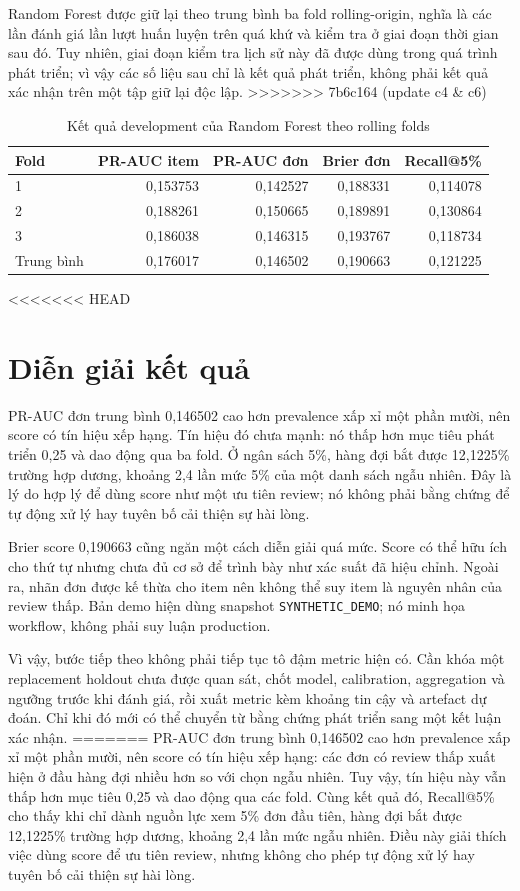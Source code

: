 Random Forest được giữ lại theo trung bình ba fold rolling-origin, nghĩa là các lần đánh giá lần lượt huấn luyện trên quá khứ và kiểm tra ở giai đoạn thời gian sau đó. Tuy nhiên, giai đoạn kiểm tra lịch sử này đã được dùng trong quá trình phát triển; vì vậy các số liệu sau chỉ là kết quả phát triển, không phải kết quả xác nhận trên một tập giữ lại độc lập.
>>>>>>> 7b6c164 (update c4 & c6)

\begin{table}[htbp]
\centering\small
\caption{Kết quả development của Random Forest theo rolling folds}
\label{tab:rolling-results}
\begin{tabular}{lrrrr}
\toprule
Fold & PR-AUC item & PR-AUC đơn & Brier đơn & Recall@5\% \\
\midrule
1 & 0,153753 & 0,142527 & 0,188331 & 0,114078 \\
2 & 0,188261 & 0,150665 & 0,189891 & 0,130864 \\
3 & 0,186038 & 0,146315 & 0,193767 & 0,118734 \\
\midrule
Trung bình & 0,176017 & 0,146502 & 0,190663 & 0,121225 \\
\bottomrule
\end{tabular}
\end{table}

<<<<<<< HEAD
\section{Diễn giải kết quả}\label{sec:analysis}

PR-AUC đơn trung bình 0,146502 cao hơn prevalence xấp xỉ một phần mười, nên score có tín hiệu xếp hạng. Tín hiệu đó chưa mạnh: nó thấp hơn mục tiêu phát triển 0,25 và dao động qua ba fold. Ở ngân sách 5\%, hàng đợi bắt được 12,1225\% trường hợp dương, khoảng 2,4 lần mức 5\% của một danh sách ngẫu nhiên. Đây là lý do hợp lý để dùng score như một ưu tiên review; nó không phải bằng chứng để tự động xử lý hay tuyên bố cải thiện sự hài lòng.

Brier score 0,190663 cũng ngăn một cách diễn giải quá mức. Score có thể hữu ích cho thứ tự nhưng chưa đủ cơ sở để trình bày như xác suất đã hiệu chỉnh. Ngoài ra, nhãn đơn được kế thừa cho item nên không thể suy item là nguyên nhân của review thấp. Bản demo hiện dùng snapshot \texttt{SYNTHETIC\_DEMO}; nó minh họa workflow, không phải suy luận production.

Vì vậy, bước tiếp theo không phải tiếp tục tô đậm metric hiện có. Cần khóa một replacement holdout chưa được quan sát, chốt model, calibration, aggregation và ngưỡng trước khi đánh giá, rồi xuất metric kèm khoảng tin cậy và artefact dự đoán. Chỉ khi đó mới có thể chuyển từ bằng chứng phát triển sang một kết luận xác nhận.
=======
PR-AUC đơn trung bình 0,146502 cao hơn prevalence xấp xỉ một phần mười, nên score có tín hiệu xếp hạng: các đơn có review thấp xuất hiện ở đầu hàng đợi nhiều hơn so với chọn ngẫu nhiên. Tuy vậy, tín hiệu này vẫn thấp hơn mục tiêu 0,25 và dao động qua các fold. Cùng kết quả đó, Recall@5\% cho thấy khi chỉ dành nguồn lực xem 5\% đơn đầu tiên, hàng đợi bắt được 12,1225\% trường hợp dương, khoảng 2,4 lần mức ngẫu nhiên. Điều này giải thích việc dùng score để ưu tiên review, nhưng không cho phép tự động xử lý hay tuyên bố cải thiện sự hài lòng.

